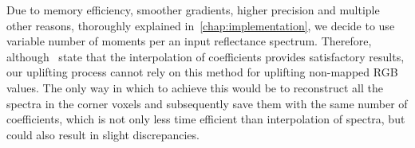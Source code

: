 Due to memory efficiency, smoother gradients, higher precision and multiple other reasons, thoroughly  explained in~\cref{chap:implementation}, we decide to use variable number of moments per an input reflectance spectrum. Therefore, although~\citet{trigonometricMomentsPaper} state that the interpolation of coefficients provides satisfactory results, our uplifting process cannot rely on this method for uplifting non-mapped RGB values. The only way in which to achieve this would be to reconstruct all the spectra in the corner voxels and subsequently save them with the same number of coefficients, which is not only less time efficient than interpolation of spectra, but could also result in slight discrepancies.

